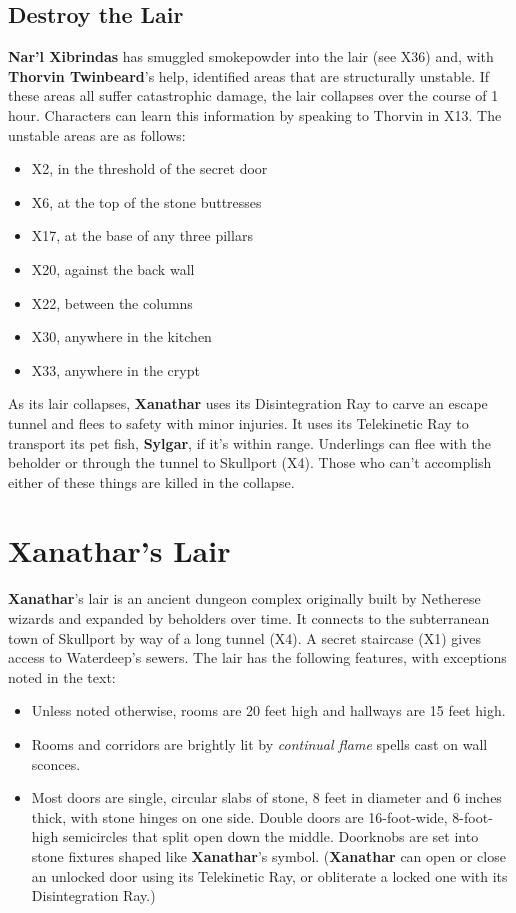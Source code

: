 \documentclass[10pt,a4paper,twoside,twocolumn,openany,nodeprecatedcode]{dndbook}
\begin{document}
\subsection{Destroy the Lair}
\textbf{Nar'l Xibrindas} has smuggled smokepowder into the lair (see X36) and, with \textbf{Thorvin Twinbeard}'s help, identified areas that are structurally unstable. If these areas all suffer catastrophic damage, the lair collapses over the course of 1 hour. Characters can learn this information by speaking to Thorvin in X13. The unstable areas are as follows:
\begin{itemize}

\item X2, in the threshold of the secret door
\item X6, at the top of the stone buttresses
\item X17, at the base of any three pillars
\item X20, against the back wall
\item X22, between the columns
\item X30, anywhere in the kitchen
\item X33, anywhere in the crypt
\end{itemize}


As its lair collapses, \textbf{Xanathar} uses its Disintegration Ray to carve an escape tunnel and flees to safety with minor injuries. It uses its Telekinetic Ray to transport its pet fish, \textbf{Sylgar}, if it's within range. Underlings can flee with the beholder or through the tunnel to Skullport (X4). Those who can't accomplish either of these things are killed in the collapse.
\section{Xanathar's Lair}
\textbf{Xanathar}'s lair is an ancient dungeon complex originally built by Netherese wizards and expanded by beholders over time. It connects to the subterranean town of Skullport by way of a long tunnel (X4). A secret staircase (X1) gives access to Waterdeep's sewers.
The lair has the following features, with exceptions noted in the text:
\begin{itemize}

\item Unless noted otherwise, rooms are 20 feet high and hallways are 15 feet high.
\item Rooms and corridors are brightly lit by \textit{continual flame} spells cast on wall sconces.
\item Most doors are single, circular slabs of stone, 8 feet in diameter and 6 inches thick, with stone hinges on one side. Double doors are 16-foot-wide, 8-foot-high semicircles that split open down the middle. Doorknobs are set into stone fixtures shaped like \textbf{Xanathar}'s symbol. (\textbf{Xanathar} can open or close an unlocked door using its Telekinetic Ray, or obliterate a locked one with its Disintegration Ray.)
\end{itemize}
\end{document}
